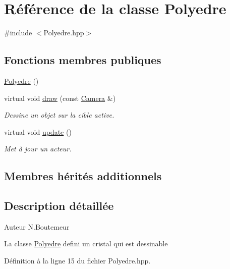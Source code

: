 \hypertarget{classPolyedre}{\section{Référence de la classe Polyedre}
\label{classPolyedre}
}


{\ttfamily \#include $<$Polyedre.\+hpp$>$}

\subsection*{Fonctions membres publiques}
\begin{DoxyCompactItemize}
\item 
\hyperlink{classPolyedre_a03cdf6d5bd3c00c62d9e174eafe92699}{Polyedre} ()
\item 
virtual void \hyperlink{classPolyedre_a57ffd7e5fbba07e8b9c9737a4507a37b}{draw} (const \hyperlink{classCamera}{Camera} \&)
\begin{DoxyCompactList}\small\item\em Dessine un objet sur la cible active. \end{DoxyCompactList}\item 
virtual void \hyperlink{classPolyedre_a9ea5863ed9ee46c090e5dbafeda0ef73}{update} ()
\begin{DoxyCompactList}\small\item\em Met à jour un acteur. \end{DoxyCompactList}\end{DoxyCompactItemize}
\subsection*{Membres hérités additionnels}


\subsection{Description détaillée}
\begin{DoxyAuthor}{Auteur}
N.\+Boutemeur
\end{DoxyAuthor}
La classe \hyperlink{classPolyedre}{Polyedre} defini un cristal qui est dessinable 

Définition à la ligne 15 du fichier Polyedre.\+hpp.



